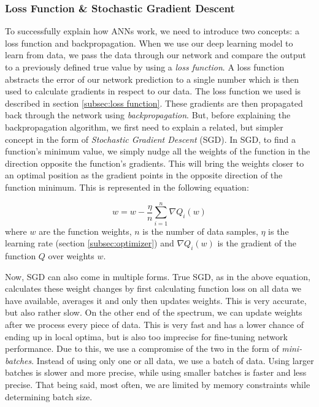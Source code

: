 \documentclass[times, utf8, diplomski, english]{fer_eng}
\begin{document}
\subsubsection{Loss Function \& Stochastic Gradient Descent}
\label{subsubsec: loss function and stochastic gradient descent}

To successfully explain how ANNs work, we need to introduce two concepts: a loss function and backpropagation. When we use our deep learning model to learn from data, we pass the data through our network and compare the output to a previously defined true value by using a \textit{loss function}. A loss function abstracts the error of our network prediction to a single number which is then used to calculate gradients in respect to our data. The loss function we used is described in section \ref{subsec:loss function}. These gradients are then propagated back through the network using \textit{backpropagation}. But, before explaining the backpropagation algorithm, we first need to explain a related, but simpler concept in the form of \textit{Stochastic Gradient Descent} (SGD). In SGD, to find a function's minimum value, we simply nudge all the weights of the function in the direction opposite the function's gradients. This will bring the weights closer to an optimal position as the gradient points in the opposite direction of the function minimum. This is represented in the following equation:

\[ w = w - \frac{\eta}{n} \sum_{i=1}^n \nabla Q_i(w) \]
where $w$ are the function weights, $n$ is the number of data samples, $\eta$ is the learning rate (section \ref{subsec:optimizer}) and $\nabla Q_i(w)$ is the gradient of the function $Q$ over weights $w$.

Now, SGD can also come in multiple forms. True SGD, as in the above equation, calculates these weight changes by first calculating function loss on all data we have available, averages it and only then updates weights. This is very accurate, but also rather slow. On the other end of the spectrum, we can update weights after we process every piece of data. This is very fast and has a lower chance of ending up in local optima, but is also too imprecise for fine-tuning network performance. Due to this, we use a compromise of the two in the form of \textit{mini-batches}. Instead of using only one or all data, we use a batch of data. Using larger batches is slower and more precise, while using smaller batches is faster and less precise. That being said, most often, we are limited by memory constraints while determining batch size.
\end{document}
